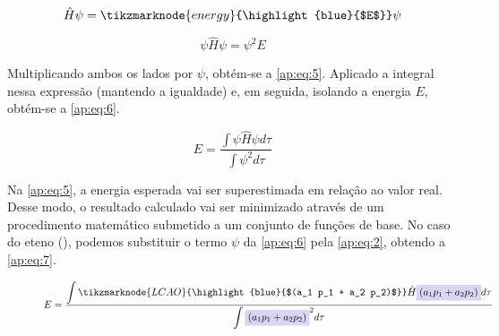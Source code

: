 
\begin{figure}[htb]
    \vspace{2\baselineskip}
\begin{equation}
\label{ap:eq:4}
    \hat{H} \psi = \tikzmarknode{energy}{\highlight{blue}{$E$}} \psi
\end{equation}
\end{figure}

\begin{equation}
\label{ap:eq:5}
    \psi \hat{H} \psi = \psi^2 E
\end{equation}


Multiplicando ambos os lados por $\psi$, obtém-se a \autoref{ap:eq:5}. Aplicado a integral nessa expressão (mantendo a igualdade) e, em seguida, isolando a energia $E$, obtém-se a \autoref{ap:eq:6}.

\begin{equation}
\label{ap:eq:6}
    E = \frac{\displaystyle \int \psi \hat{H} \psi d\tau}{\displaystyle \int \psi^2 d\tau}
\end{equation}

Na \autoref{ap:eq:5}, a energia esperada vai ser superestimada em relação ao valor real. Desse modo, o resultado calculado vai ser minimizado através de um procedimento matemático submetido a um conjunto de funções de base. No caso do eteno (), podemos substituir o termo $\psi$ da \autoref{ap:eq:6} pela \autoref{ap:eq:2}, obtendo a \autoref{ap:eq:7}.

\begin{figure}[htb]
    \vspace{2\baselineskip}
\begin{equation}
\label{ap:eq:7}
    E = \frac{\displaystyle \int \tikzmarknode{LCAO}{\highlight{blue}{$(a_1 p_1 + a_2 p_2)$}} \hat{H} \highlight{blue}{$(a_1 p_1 + a_2 p_2)$} d\tau}{\displaystyle \int \highlight{blue}{$(a_1 p_1 + a_2 p_2)$}^2 d\tau}
\end{equation}
\end{figure}

